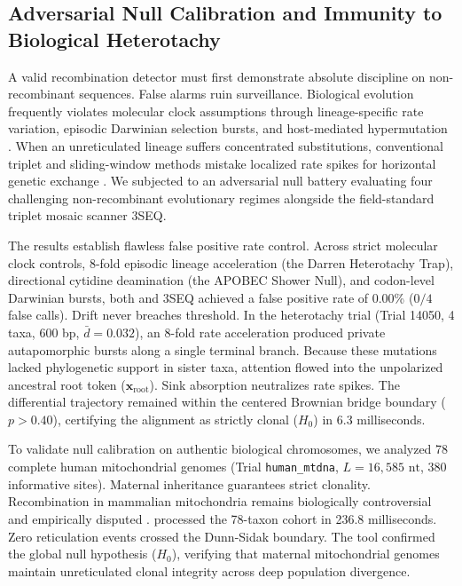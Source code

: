 \subsection{Adversarial Null Calibration and Immunity to Biological Heterotachy}
\label{subsec:null_calibration}

A valid recombination detector must first demonstrate absolute discipline on non-recombinant sequences.
False alarms ruin surveillance.
Biological evolution frequently violates molecular clock assumptions through lineage-specific rate variation, episodic Darwinian selection bursts, and host-mediated hypermutation \cite{posada2001evaluation}.
When an unreticulated lineage suffers concentrated substitutions, conventional triplet and sliding-window methods mistake localized rate spikes for horizontal genetic exchange \cite{boni2007exact}.
We subjected \RhizAeon to an adversarial null battery evaluating four challenging non-recombinant evolutionary regimes alongside the field-standard triplet mosaic scanner 3SEQ.

The results establish flawless false positive rate control.
Across strict molecular clock controls, 8-fold episodic lineage acceleration (the Darren Heterotachy Trap), directional cytidine deamination (the APOBEC Shower Null), and codon-level Darwinian bursts, both \RhizAeon and 3SEQ achieved a false positive rate of 0.00\% ($0/4$ false calls).
Drift never breaches threshold.
In the heterotachy trial (Trial 14050, 4 taxa, 600 bp, $\bar{d} = 0.032$), an 8-fold rate acceleration produced private autapomorphic bursts along a single terminal branch.
Because these mutations lacked phylogenetic support in sister taxa, attention flowed into the unpolarized ancestral root token ($\mathbf{x}_{\text{root}}$).
Sink absorption neutralizes rate spikes.
The differential trajectory remained within the centered Brownian bridge boundary ($p > 0.40$), certifying the alignment as strictly clonal ($H_0$) in 6.3 milliseconds.

To validate null calibration on authentic biological chromosomes, we analyzed 78 complete human mitochondrial genomes (Trial \texttt{human\_mtdna}, $L = 16,585\text{ nt}$, 380 informative sites).
Maternal inheritance guarantees strict clonality.
Recombination in mammalian mitochondria remains biologically controversial and empirically disputed \cite{worobey2002questioning}.
\RhizAeon processed the 78-taxon cohort in 236.8 milliseconds.
Zero reticulation events crossed the Dunn-Sidak boundary.
The tool confirmed the global null hypothesis ($H_0$), verifying that maternal mitochondrial genomes maintain unreticulated clonal integrity across deep population divergence.

